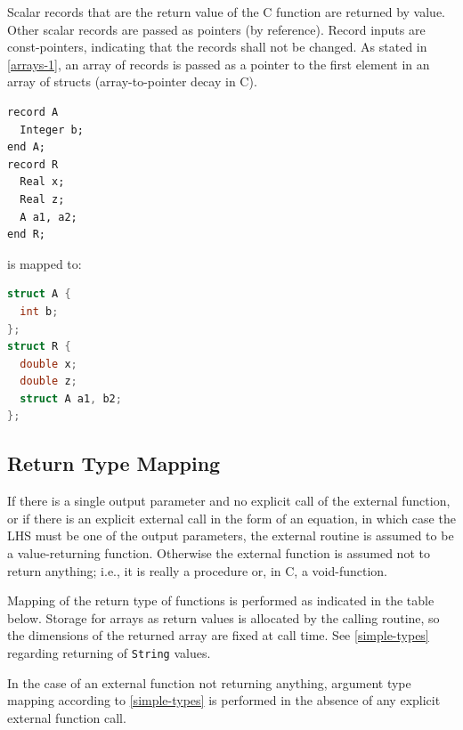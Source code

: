 Scalar records that are the return value of the C function are returned by value.
Other scalar records are passed as pointers (by reference).
Record inputs are const-pointers, indicating that the records shall not be changed.
As stated in \cref{arrays-1}, an array of records is passed as a pointer to the first element in an array of structs (array-to-pointer decay in C).

\begin{example}
\begin{lstlisting}[language=modelica]
record A
  Integer b;
end A;
record R
  Real x;
  Real z;
  A a1, a2;
end R;
\end{lstlisting}
is mapped to:
\begin{lstlisting}[language=C]
struct A {
  int b;
};
struct R {
  double x;
  double z;
  struct A a1, b2;
};
\end{lstlisting}
\end{example}

\subsection{Return Type Mapping}\label{return-type-mapping}

If there is a single output parameter and no explicit call of the external function, or if there is an explicit external call in the form of an equation, in which case the LHS must be one of the output parameters, the external routine is assumed to be a value-returning function.
Otherwise the external function is assumed not to return anything; i.e., it is really a procedure or, in C, a void-function.

Mapping of the return type of functions is performed as indicated in the table below.
Storage for arrays as return values is allocated by the calling routine, so the dimensions of the returned array are fixed at call time.
See \cref{simple-types} regarding returning of {\lstinline!String!} values.

\begin{nonnormative}
In the case of an external function not returning anything, argument type mapping according to \cref{simple-types} is performed in the absence of any explicit external function call.
\end{nonnormative}

